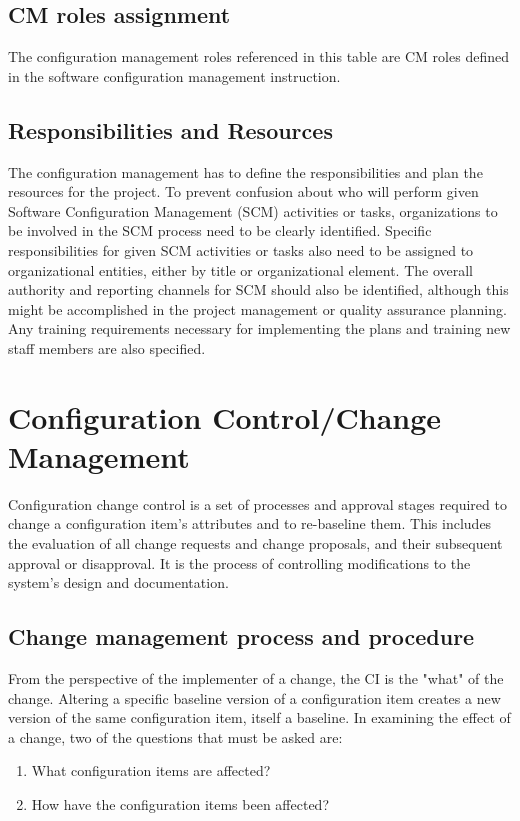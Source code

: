 \documentclass{template/openetcs_article}
\begin{document}
\subsection{CM roles assignment} %
The configuration management roles referenced in this table are CM roles defined in the software configuration management  instruction.

\subsection{Responsibilities and Resources} %
The configuration management has to define the responsibilities and plan the resources for the project. To prevent confusion  about who will perform given Software Configuration Management (SCM) activities or tasks, organizations to be involved in  the SCM process need to be clearly identified. Specific responsibilities for given SCM activities or tasks also need to be  assigned to organizational entities, either by title or organizational element. The overall authority and reporting channels for  SCM should also be identified, although this might be accomplished in the project management or quality assurance planning.  Any training requirements necessary for implementing the plans and training new staff members are also specified.


\section{Configuration Control/Change Management} %
Configuration change control is a set of processes and approval stages required to change a configuration item's attributes  and to re-baseline them. This includes the evaluation of all change requests and change proposals, and their subsequent  approval or disapproval. It is the process of controlling modifications to the system's design and documentation.

\subsection{Change management process and procedure} %
From the perspective of the implementer of a change, the CI is the "what" of the change. Altering a specific baseline version  of a configuration item creates a new version of the same configuration item, itself a baseline. In examining the effect of a  change, two of the questions that must be asked are: 

\vspace{-10pt}
\begin{enumerate}
\item What configuration items are affected?
\item How have the configuration items been affected?
\end{enumerate}
\end{document}
